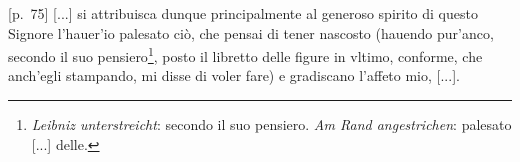 \pend \pstart {} [p.~75] [...] si attribuisca dunque principalmente al generoso spirito di questo Signore\protect{} l'hauer'io palesato ci\`{o}, che pensai di tener nascosto (hauendo pur'anco, secondo il suo pensiero\footnote{\textit{Leibniz unterstreicht}: secondo il suo pensiero. \textit{Am Rand angestrichen}: palesato [...] delle.%
}, posto il libretto delle figure in vltimo, conforme, che anch'egli stampando, mi disse di voler fare) e gradiscano l'affeto mio, [...].\pend 